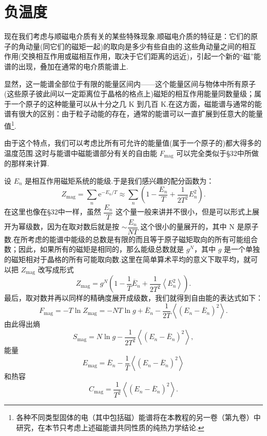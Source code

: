 \section{负温度}

现在我们考虑与顺磁电介质有关的某些特殊现象.顺磁电介质的特征是：它们的原子的角动量(同它们的磁矩一起)的取向是多少有些自由的.这些角动量之间的相互作用(交换相互作用或磁相互作用，取决于它们距离的远近)，引起一个新的“磁”能谱的出现，叠加在通常的电介质能谱上.

显然，这一能谱全部位于有限的能量区间内——这个能量区间与物体中所有原子(这些原子彼此间以一定距离位于晶格的格点上)磁矩的相互作用能量同数量级；属于一个原子的这种能量可以从十分之几 K 到几百 K.在这方面，磁能谱与通常的能谱有很大的区别：由于粒子动能的存在，通常的能谱可以一直扩展到任意大的能量值\footnote{各种不同类型固体的电（其中包括磁）能谱将在本教程的另一卷（第九卷）中研究，在本节只考虑上述磁能谱共同性质的纯热力学结论.}.

由于这个特点，我们可以考虑比所有可允许的能量值(属于一个原子的)都大得多的温度范围.这时与能谱中磁能谱部分有关的自由能 $F_{\mathrm{mag}}$ 可以完全类似于§32中所做的那样来计算.

设 $E_n$ 是相互作用磁矩系统的能级.于是我们感兴趣的配分函数为：
\begin{equation*}
  Z_{\mathrm{mag}}=\sum_n\mathrm{e}^{-E_n/T}\approx\sum_n\left(1-\frac{E_n}{T}+\frac{1}{2T^2}E_n^2\right).
\end{equation*}
在这里也像在§32中一样，虽然 $\dfrac{E_n}{T}$ 这个量一般来讲并不很小，但是可以形式上展开为幂级数，因为在取对数后就是按 $\sim\dfrac{E_n}{NT}$ 这个很小的量展开的，其中 N 是原子数.在所考虑的能谱中能级的总数是有限的而且等于原子磁矩取向的所有可能组合数；因此，如果所有的磁矩是相同的，那么能级总数就是 $g^N$，其中 $g$ 是一个单独的磁矩相对于晶格的所有可能取向数.这里在简单算术平均的意义下取平均，就可以把 $Z_{\mathrm{mag}}$ 改写成形式
\begin{equation*}
  Z_{\mathrm{mag}}=g^N\left(1-\frac{1}{T}\overline{E}_n+\frac{1}{2T^2}\left\langle E_n^2\right\rangle\right).
\end{equation*}
最后，取对数并再以同样的精确度展开成级数，我们就得到自由能的表达式如下：
\begin{equation}
  F_{\mathrm{mag}}=-T\ln Z_{\mathrm{mag}}=-NT\ln g+\overline{E}_n-\frac{1}{2T}\left\langle\left(E_n-\overline{E}_n\right)^2\right\rangle.
\end{equation}
由此得出熵
\begin{equation}
  S_{\mathrm{mag}}=N\ln g-\frac{1}{2T^2}\left\langle\left(E_n-\overline{E}_n\right)^2\right\rangle,
\end{equation}
能量
\begin{equation}
  E_{\mathrm{mag}}=\overline{E}_n-\frac{1}{T}\left\langle\left(E_n-\overline{E}_n\right)^2\right\rangle
\end{equation}
和热容
\begin{equation}
  C_{\mathrm{mag}}=\frac{1}{T^2}\left\langle\left(E_n-\overline{E}_n\right)^2\right\rangle.
\end{equation}


